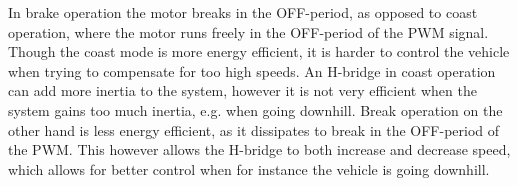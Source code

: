 In brake operation the motor breaks in the OFF-period, as opposed to coast operation, where the motor runs freely in the OFF-period of the PWM signal. Though the coast mode is more energy efficient, it is harder to control the vehicle when trying to compensate for too high speeds. An H-bridge in coast operation can add more inertia to the system, however it is not very efficient when the system gains too much inertia, e.g. when going downhill. Break operation on the other hand is less energy efficient, as it dissipates to break in the OFF-period of the PWM. This however allows the H-bridge to both increase and decrease speed, which allows for better control when for instance the vehicle is going downhill.